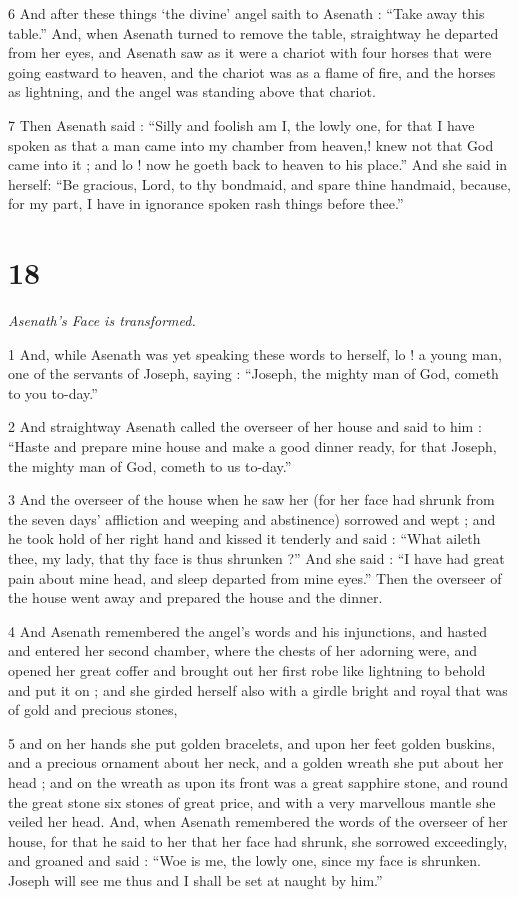 6 And after these things ‘the divine’ angel saith to Asenath : “Take away this table.” And, when Asenath turned to remove the table, straightway he departed from her eyes, and Asenath saw as it were a chariot with four horses that were going eastward to heaven, and the chariot was as a flame of fire, and the horses as lightning, and the angel was standing above that chariot. 

7 Then Asenath said : “Silly and foolish am I, the lowly one, for that I have spoken as that a man came into my chamber from heaven,! knew not that God came into it ; and lo ! now he goeth back to heaven to his place.” And she said in herself: “Be gracious, Lord, to thy bondmaid, and spare thine handmaid, because, for my part, I have in ignorance spoken rash things before thee.”

\chapter{18}

\par \textit{Asenath's Face is transformed.}

1 And, while Asenath was yet speaking these words to herself, lo ! a young man, one of the servants of Joseph, saying : “Joseph, the mighty man of God, cometh to you to-day.” 

2 And straightway Asenath called the overseer of her house and said to him : “Haste and prepare mine house and make a good dinner ready, for that Joseph, the mighty man of God, cometh to us to-day.” 

3 And the overseer of the house when he saw her (for her face had shrunk from the seven days' affliction and weeping and abstinence) sorrowed and wept ; and he took hold of her right hand and kissed it tenderly and said : “What aileth thee, my lady, that thy face is thus shrunken ?” And she said : “I have had great pain about mine head, and sleep departed from mine eyes.” Then the overseer of the house went away and prepared the house and the dinner. 

4 And Asenath remembered the angel's words and his injunctions, and hasted and entered her second chamber, where the chests of her adorning were, and opened her great coffer and brought out her first robe like lightning to behold and put it on ; and she girded herself also with a girdle bright and royal that was of gold and precious stones, 

5 and on her hands she put golden bracelets, and upon her feet golden buskins, and a precious ornament about her neck, and a golden wreath she put about her head ; and on the wreath as upon its front was a great sapphire stone, and round the great stone six stones of great price, and with a very marvellous mantle she veiled her head. And, when Asenath remembered the words of the overseer of her house, for that he said to her that her face had shrunk, she sorrowed exceedingly, and groaned and said : “Woe is me, the lowly one, since my face is shrunken. Joseph will see me thus and I shall be set at naught by him.” 

